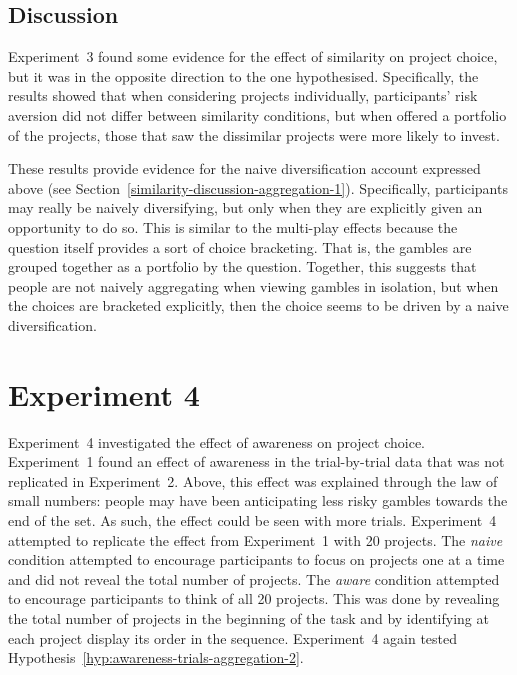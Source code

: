 \documentclass[a4paper, nobind, dvipsnames]{templates/ociamthesis}
\theoremstyle{definition}
\theoremstyle{definition}
\theoremstyle{definition}
\theoremstyle{definition}
\theoremstyle{remark}
\begin{document}
\subsection{Discussion}

Experiment~3 found some evidence for the effect of similarity on project choice,
but it was in the opposite direction to the one hypothesised. Specifically, the
results showed that when considering projects individually, participants' risk
aversion did not differ between similarity conditions, but when offered a
portfolio of the projects, those that saw the dissimilar projects were more
likely to invest.

These results provide evidence for the naive diversification account expressed
above (see Section~\ref{similarity-discussion-aggregation-1}). Specifically,
participants may really be naively diversifying, but only when they are
explicitly given an opportunity to do so. This is similar to the multi-play
effects because the question itself provides a sort of choice bracketing. That
is, the gambles are grouped together as a portfolio by the question. Together,
this suggests that people are not naively aggregating when viewing gambles in
isolation, but when the choices are bracketed explicitly, then the choice seems
to be driven by a naive diversification.

\hypertarget{aggregation-4}{%
\section{Experiment 4}\label{aggregation-4}}

Experiment~4 investigated the effect of awareness on project choice.
Experiment~1 found an effect of awareness in the trial-by-trial data that was
not replicated in Experiment~2. Above, this effect was explained through the law
of small numbers: people may have been anticipating less risky gambles towards
the end of the set. As such, the effect could be seen with more trials.
Experiment~4 attempted to replicate the effect from Experiment~1 with 20
projects. The \emph{naive} condition attempted to encourage participants to focus on
projects one at a time and did not reveal the total number of projects. The
\emph{aware} condition attempted to encourage participants to think of all 20
projects. This was done by revealing the total number of projects in the
beginning of the task and by identifying at each project display its order in
the sequence. Experiment~4 again tested
Hypothesis~\ref{hyp:awareness-trials-aggregation-2}.
\end{document}
